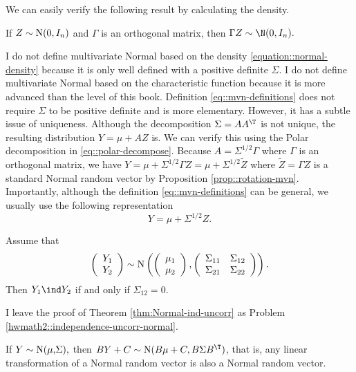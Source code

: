 We can easily verify the following result by calculating the density.

\begin{proposition}\label{prop::rotation-mvn}
If $Z\sim\textup{N}(0,I_{n})$ and $\Gamma$ is an orthogonal matrix, then
$\Gamma Z\sim \N(0,I_{n}).$
\end{proposition}


I do not define multivariate Normal based on the density \eqref{equation::normal-density} because it is only well defined with a positive definite $\Sigma$. I do not define multivariate Normal based on the characteristic function because it is more advanced than the level of this book.
Definition \eqref{eq::mvn-definitions} does not require $\Sigma$ to be positive definite and is more elementary. 
However, it has a subtle issue of uniqueness. Although
the decomposition $\Sigma=AA^{\T}$ is not unique, the resulting distribution
$Y=\mu+AZ$ is. We can verify this using the Polar decomposition in \eqref{eq::polar-decompose}. 
Because $A=\Sigma^{1/2}\Gamma$ where $\Gamma$ is an orthogonal matrix,
we have $Y=\mu+\Sigma^{1/2}\Gamma Z=\mu+\Sigma^{1/2}\tilde{Z}$ where
$\tilde{Z}=\Gamma Z$ is a standard Normal random vector by Proposition \ref{prop::rotation-mvn}.
Importantly, although the definition \eqref{eq::mvn-definitions} can be general, we usually use the following representation
$$
Y=\mu+ \Sigma^{1/2} Z.
$$



\begin{theorem}
\label{thm:Normal-ind-uncorr}Assume that
\[
\left(\begin{array}{c}
Y_{1}\\
Y_{2}
\end{array}\right)\sim\textup{N}\left(\left(\begin{array}{c}
\mu_{1}\\
\mu_{2}
\end{array}\right),\left(\begin{array}{cc}
\Sigma_{11} & \Sigma_{12}\\
\Sigma_{21} & \Sigma_{22}
\end{array}\right)\right).
\]
Then $Y_{1}\ind Y_{2}$ if and only if $\Sigma_{12}=0.$
\end{theorem}
%
I leave the proof of Theorem \ref{thm:Normal-ind-uncorr} as Problem \ref{hwmath2::independence-uncorr-normal}.



\begin{proposition}\label{prop::linear-normal}
If $Y\sim\textup{N(\ensuremath{\mu,}\ensuremath{\Sigma})},$ then $BY+C\sim\textup{N\ensuremath{(B\mu+C,B\Sigma B^{\T}})}$,
that is, any linear transformation of a Normal random vector is also
a Normal random vector.
\end{proposition}

